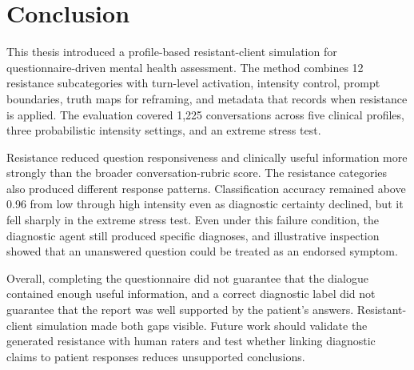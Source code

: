 \section{Conclusion}\label{s:conclusion}

This thesis introduced a profile-based resistant-client simulation for questionnaire-driven mental health assessment. The method combines 12 resistance subcategories with turn-level activation, intensity control, prompt boundaries, truth maps for reframing, and metadata that records when resistance is applied. The evaluation covered 1,225 conversations across five clinical profiles, three probabilistic intensity settings, and an extreme stress test.

Resistance reduced question responsiveness and clinically useful information more strongly than the broader conversation-rubric score. The resistance categories also produced different response patterns. Classification accuracy remained above 0.96 from low through high intensity even as diagnostic certainty declined, but it fell sharply in the extreme stress test. Even under this failure condition, the diagnostic agent still produced specific diagnoses, and illustrative inspection showed that an unanswered question could be treated as an endorsed symptom.

Overall, completing the questionnaire did not guarantee that the dialogue contained enough useful information, and a correct diagnostic label did not guarantee that the report was well supported by the patient's answers. Resistant-client simulation made both gaps visible. Future work should validate the generated resistance with human raters and test whether linking diagnostic claims to patient responses reduces unsupported conclusions.

